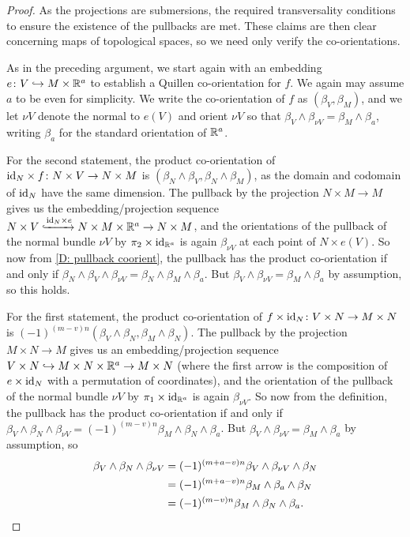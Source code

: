 \begin{proof}
	As the projections are submersions, the required transversality conditions to ensure the existence of the pullbacks are met.
	These claims are then clear concerning maps of topological spaces, so we need only verify the co-orientations.

	As in the preceding argument, we start again with an embedding $e \colon V \hookrightarrow M \times \mathbb{R}^a$ to establish a Quillen co-orientation for $f$.
	We again may assume $a$ to be even for simplicity.
	We write the co-orientation of $f$ as $(\beta_V,\beta_M)$, and we let $\nu V$ denote the normal to $e(V)$ and orient $\nu V$ so that $\beta_V \wedge \beta_{\nu V} = \beta_M \wedge \beta_a$, writing $\beta_a$ for the standard orientation of $\mathbb{R}^a$.

	For the second statement, the product co-orientation of $\mathrm{id}_N \times f \colon N \times V \to N \times M$ is $(\beta_N \wedge \beta_V,\beta_N \wedge \beta_M)$, as the domain and codomain of $\mathrm{id}_N$ have the same dimension.
	The pullback by the projection $N \times M \to M$ gives us the embedding/projection sequence $N \times V\xhookrightarrow{\mathrm{id}_N \times e} N \times M \times \mathbb{R}^a \to N \times M$, and the orientations of the pullback of the normal bundle $\nu V$ by $\pi_2 \times \mathrm{id}_{\mathbb{R}^a}$ is again $\beta_{\nu V}$ at each point of $N \times e(V)$.
	So now from \cref{D: pullback coorient}, the pullback has the product co-orientation if and only if $\beta_N \wedge \beta_V \wedge \beta_{\nu V} = \beta_N \wedge \beta_M \wedge \beta_a$.
	But $ \beta_V \wedge \beta_{\nu V} = \beta_M \wedge \beta_a$ by assumption, so this holds.

	For the first statement, the product co-orientation of $f \times \mathrm{id}_N \colon V \times N \to M \times N$ is $(-1)^{(m-v)n}(\beta_V \wedge \beta_N,\beta_M \wedge \beta_N)$.
	The pullback by the projection $M \times N \to M$ gives us an embedding/projection sequence $V \times N \hookrightarrow M \times N \times \mathbb{R}^a \to M \times N$ (where the first arrow is the composition of $e \times \mathrm{id}_N$ with a permutation of coordinates), and the orientation of the pullback of the normal bundle $\nu V$ by $\pi_1 \times \mathrm{id}_{\mathbb{R}^a}$ is again $\beta_{\nu V}$.
	So now from the definition, the pullback has the product co-orientation if and only if $\beta_V \wedge \beta_N \wedge \beta_{\nu V} = (-1)^{(m-v)n}\beta_M \wedge \beta_N \wedge \beta_a$.
	But $ \beta_V \wedge \beta_{\nu V} = \beta_M \wedge \beta_a$ by assumption, so
	\begin{align*}
		\beta_V \wedge \beta_N \wedge \beta_{\nu V}& = (-1)^{(m+a-v)n}\beta_V \wedge \beta_{\nu V} \wedge \beta_N\\
		& = (-1)^{(m+a-v)n}\beta_M \wedge \beta_a \wedge \beta_N\\
		& = (-1)^{(m-v)n}\beta_M \wedge \beta_N \wedge \beta_a.\qedhere
	\end{align*}
\end{proof}

